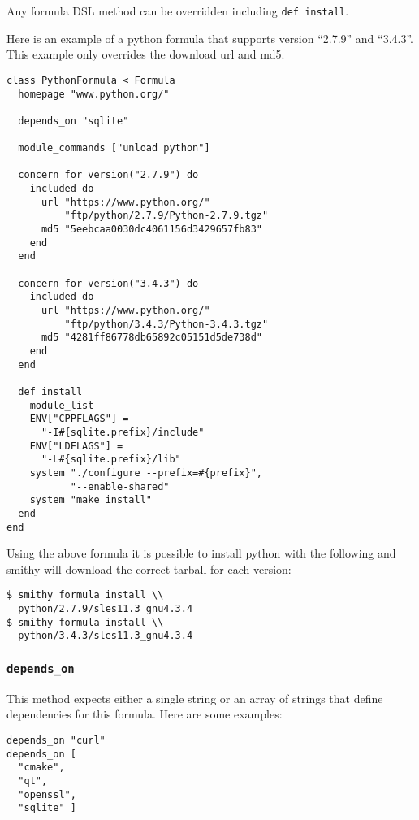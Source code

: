 \documentclass{acm_proc_article-sp}
\begin{document}
Any formula DSL method can be overridden including \texttt{def install}.

Here is an example of a python formula that supports version ``2.7.9'' and
``3.4.3''. This example only overrides the download url and md5.

\begin{quoting}
\begin{verbatim}
class PythonFormula < Formula
  homepage "www.python.org/"

  depends_on "sqlite"

  module_commands ["unload python"]

  concern for_version("2.7.9") do
    included do
      url "https://www.python.org/"
          "ftp/python/2.7.9/Python-2.7.9.tgz"
      md5 "5eebcaa0030dc4061156d3429657fb83"
    end
  end

  concern for_version("3.4.3") do
    included do
      url "https://www.python.org/"
          "ftp/python/3.4.3/Python-3.4.3.tgz"
      md5 "4281ff86778db65892c05151d5de738d"
    end
  end

  def install
    module_list
    ENV["CPPFLAGS"] =
      "-I#{sqlite.prefix}/include"
    ENV["LDFLAGS"] =
      "-L#{sqlite.prefix}/lib"
    system "./configure --prefix=#{prefix}",
           "--enable-shared"
    system "make install"
  end
end
\end{verbatim}
\end{quoting}

Using the above formula it is possible to install python with the following and
smithy will download the correct tarball for each version:

\begin{quoting}
\begin{verbatim}
$ smithy formula install \\
  python/2.7.9/sles11.3_gnu4.3.4
$ smithy formula install \\
  python/3.4.3/sles11.3_gnu4.3.4
\end{verbatim}
\end{quoting}

\subsubsection{\texttt{depends\_on}}

This method expects either a single string or an array of strings that define
dependencies for this formula. Here are some examples:

\begin{quoting}
\begin{verbatim}
depends_on "curl"
depends_on [
  "cmake",
  "qt",
  "openssl",
  "sqlite" ]
\end{verbatim}
\end{quoting}
\end{document}
